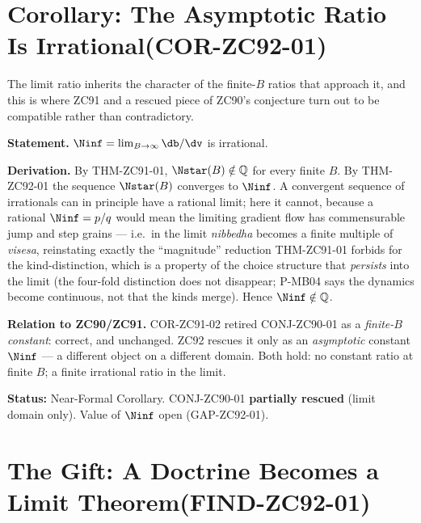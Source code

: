 \documentclass[12pt, a4paper]{article}
\begin{document}
\section{Corollary: The Asymptotic Ratio Is Irrational\quad(COR-ZC92-01)}
\label{sec:cor-zc92}

The limit ratio inherits the character of the finite-$B$ ratios that
approach it, and this is where ZC91 and a rescued piece of ZC90's
conjecture turn out to be compatible rather than contradictory.

\begin{formalbox}[title={COR-ZC92-01: $\Ninf$ Irrational; CONJ-ZC90-01
  Partially Rescued ($R_0$, Near-Formal)}]
\textbf{Statement.} $\Ninf=\lim_{B\to\infty}\db/\dv$ is irrational.

\textbf{Derivation.} By THM-ZC91-01, $\Nstar(B)\notin\mathbb{Q}$ for every
finite $B$. By THM-ZC92-01 the sequence $\Nstar(B)$ converges to $\Ninf$.
A convergent sequence of irrationals can in principle have a rational
limit; here it cannot, because a rational $\Ninf=p/q$ would mean the
limiting gradient flow has commensurable jump and step grains --- i.e.\ in
the limit \emph{nibbedha} becomes a finite multiple of \emph{visesa},
reinstating exactly the ``magnitude'' reduction THM-ZC91-01 forbids for
the kind-distinction, which is a property of the choice structure that
\emph{persists} into the limit (the four-fold distinction does not
disappear; P-MB04 says the dynamics become continuous, not that the
kinds merge). Hence $\Ninf\notin\mathbb{Q}$.

\textbf{Relation to ZC90/ZC91.} COR-ZC91-02 retired CONJ-ZC90-01 as a
\emph{finite-$B$ constant}: correct, and unchanged. ZC92 rescues it only
as an \emph{asymptotic} constant $\Ninf$ --- a different object on a
different domain. Both hold: no constant ratio at finite $B$; a finite
irrational ratio in the limit.

\textbf{Status:} Near-Formal Corollary. CONJ-ZC90-01 \textbf{partially
rescued} (limit domain only). Value of $\Ninf$ open (GAP-ZC92-01).
\end{formalbox}

\section{The Gift: A Doctrine Becomes a Limit Theorem\quad(FIND-ZC92-01)}
\label{sec:find-zc92}
\end{document}
